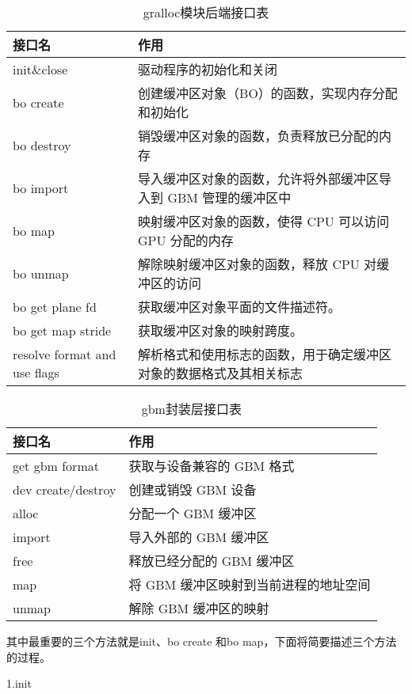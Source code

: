 \begin{table}[h]  
  \centering
  \caption{gralloc模块后端接口表}
  \label{tab:gralloc模块后端接口表}
  \begin{tabular}{ll}
    \toprule
    接口名  & 作用\\
    \midrule
    init\&close & 驱动程序的初始化和关闭 \\
    bo create & 创建缓冲区对象（BO）的函数，实现内存分配和初始化 \\
    bo destroy & 销毁缓冲区对象的函数，负责释放已分配的内存 \\
    bo import & 导入缓冲区对象的函数，允许将外部缓冲区导入到 GBM 管理的缓冲区中 \\
    bo map & 映射缓冲区对象的函数，使得 CPU 可以访问 GPU 分配的内存 \\
    bo unmap & 解除映射缓冲区对象的函数，释放 CPU 对缓冲区的访问 \\
    bo get plane fd & 获取缓冲区对象平面的文件描述符。\\
    bo get map stride & 获取缓冲区对象的映射跨度。 \\
    resolve format and use flags & 解析格式和使用标志的函数，用于确定缓冲区对象的数据格式及其相关标志 \\
    \bottomrule
  \end{tabular}
  \note{}
\end{table}

\begin{table}[h]  
  \centering
  \caption{gbm封装层接口表}
  \label{tab:gbm封装层接口表}
  \begin{tabular}{ll}
    \toprule
    接口名  & 作用\\
    \midrule
    get gbm format & 获取与设备兼容的 GBM 格式 \\
    dev create/destroy & 创建或销毁 GBM 设备 \\
    alloc & 分配一个 GBM 缓冲区 \\
    import & 导入外部的 GBM 缓冲区 \\
    free & 释放已经分配的 GBM 缓冲区 \\
    map & 将 GBM 缓冲区映射到当前进程的地址空间 \\
    unmap & 解除 GBM 缓冲区的映射 \\
    \bottomrule
  \end{tabular}
  \note{}
\end{table}

其中最重要的三个方法就是init、bo create 和bo map，下面将简要描述三个方法的过程。

1.init


